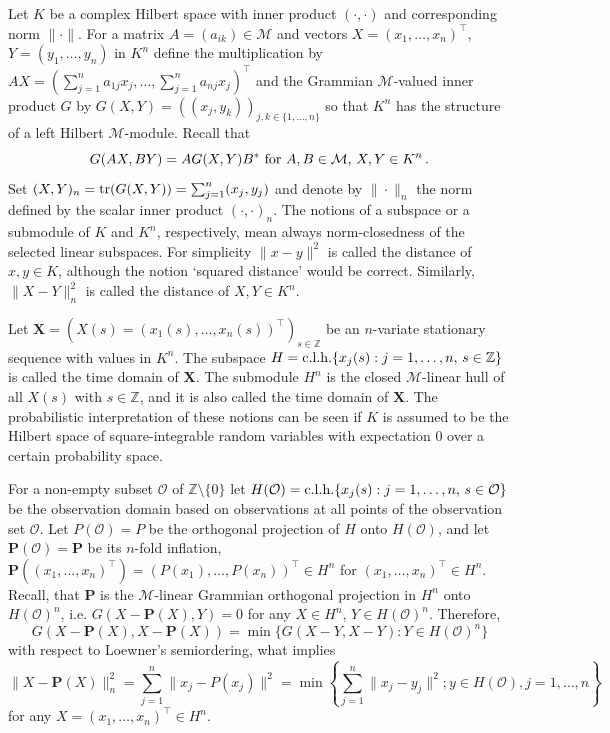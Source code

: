 \documentclass{amsart}
\begin{document}
Let $K$ be a complex Hilbert space with inner product $(\cdot,\cdot)$ and corresponding norm $\| \cdot \|$. For a matrix $A=(a_{ik}) \in \mathcal M$ and vectors $X=(x_1,\ldots,x_n)^\top$, $Y=(y_1,\ldots,y_n)$ in $K^n$ define the multiplication by $AX=(\sum_{j=1}^n a_{1j}x_j,\ldots, \sum_{j=1}^n a_{nj} x_j)^\top$ and the Grammian $\mathcal M$-valued inner product $G$ by $G(X,Y)=((x_j,y_k))_{j,k \in \{ 1,\ldots,n \}}$ so that $K^n$ has the structure of a left Hilbert $\mathcal M$-module. Recall that
\begin{equation} \label{f6.1}
    G(AX,BY) = A G(X,Y) B^* \,\, {\rm for} \,\,A,B \in {\mathcal M}, \, X,Y \in K^n  \, .
\end{equation}    
Set $(X,Y)_n = {\rm tr}(G(X,Y)) = \sum_{j=1}^n (x_j,y_j)$ and denote by $\| \cdot \|_n$ the norm defined by the scalar inner product $(\cdot,\cdot)_n$. The notions of a subspace or a submodule of $K$ and $K^n$, respectively, mean always norm-closedness of the selected linear subspaces. For simplicity $\|x-y\|^2$ is called the distance of $x,y \in K$, although the notion `squared distance' would be correct. Similarly, $\| X-Y \|_n^2$ is called the distance of $X,Y \in K^n$. 

Let ${\mathbf X} = (X(s)=(x_1(s),\ldots,x_n(s))^\top )_{s \in {\mathbb Z}}$ be an $n$-variate stationary sequence with values in $K^n$. The subspace $H={\rm c.l.h.}\{ x_j(s) : j=1,\ldots,n , \, s \in {\mathbb Z} \}$ is called the time domain of $\mathbf X$. The submodule $H^n$ is the closed $\mathcal M$-linear hull of all $X(s)$ with $s \in \mathbb Z$, and it is also called the time domain of $\mathbf X$. The probabilistic interpretation of these notions can be seen if $K$ is assumed to be the Hilbert space of square-integrable random variables  with expectation $0$ over a certain probability space. 

For a non-empty subset $\mathcal O$ of ${\mathbb Z} \setminus \{ 0 \}$ let $H({\mathcal O})= {\rm c.l.h.} \{ x_j(s) : j= 1,\ldots,n, \, s \in {\mathcal O} \}$ be the observation domain  based on observations at all points of the observation set $\mathcal O$. Let $P({\mathcal O})=P$ be the orthogonal projection of $H$ onto $H({\mathcal O})$, and let ${\mathbf P}({\mathcal O})={\mathbf P}$ be its $n$-fold inflation, ${\mathbf P}((x_1,\ldots,x_n)^\top) = (P(x_1),\ldots,P(x_n))^\top \in H^n$ for $(x_1, \ldots , x_n)^\top \in H^n$. Recall, that $\mathbf P$ is the $\mathcal M$-linear Grammian orthogonal projection in $H^n$ onto $H({\mathcal O})^n$, i.e. $G(X-{\mathbf P}(X),Y)=0$ for any $X \in H^n$, $Y \in H({\mathcal O})^n$. Therefore,
\begin{equation} \label{f6.2}
    G(X-{\mathbf P}(X),X-{\mathbf P}(X) ) = \min \{ G(X-Y,X-Y) : Y \in H({\mathcal O})^n \}
\end{equation}
with respect to Loewner's semiordering, what implies 
\[
    \| X-{\mathbf P}(X) \|_n^2 = \sum_{j=1}^n \| x_j-P(x_j) \|^2 = \min \left\{ \sum_{j=1}^n \| x_j-y_j \|^2 ; y \in H({\mathcal O}), j = 1,\ldots,n \right\}
\]
for any $X=(x_1,\ldots,x_n)^\top \in H^n$. 
\end{document}
